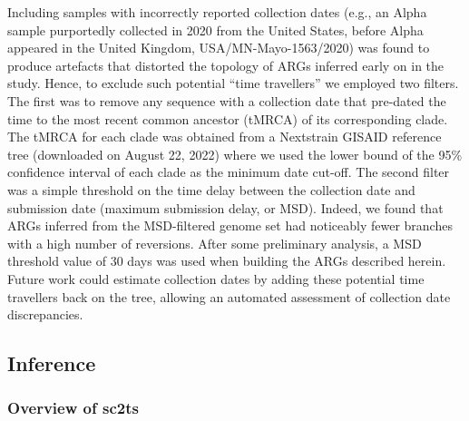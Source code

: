 \documentclass{article}
\begin{document}
Including samples with incorrectly reported collection dates (e.g., an Alpha
sample purportedly collected in 2020 from the United States, before Alpha
appeared in the United Kingdom, USA/MN-Mayo-1563/2020) was found to produce
artefacts that distorted the topology of ARGs inferred early on in the study.
Hence, to exclude such potential ``time travellers'' we employed two filters.
The first was to remove any sequence with a collection date that pre-dated the
time to the most recent common ancestor (tMRCA) of its corresponding clade. The
tMRCA for each clade was obtained from a Nextstrain GISAID reference tree
(downloaded on August 22, 2022) where we used the lower bound of the 95\%
confidence interval of each clade as the minimum date cut-off. The second
filter was a simple threshold on the time delay between the collection date and
submission date (maximum submission delay, or MSD). Indeed, we found that ARGs
inferred from the MSD-filtered genome set had noticeably fewer branches with a
high number of reversions. After some preliminary analysis, a MSD threshold
value of 30 days was used when building the ARGs described herein. Future work
could estimate collection dates by adding these potential time travellers back
on the tree, allowing an automated assessment of collection date discrepancies.

\subsection{Inference}

\subsubsection{Overview of sc2ts}
\end{document}
